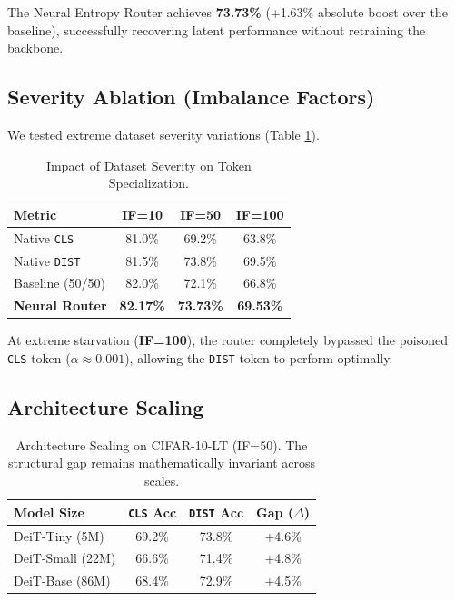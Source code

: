 \documentclass[10pt,twocolumn,letterpaper]{article}
\begin{document}
The Neural Entropy Router achieves \textbf{73.73\%} (+1.63\% absolute boost over the baseline), successfully recovering latent performance without retraining the backbone. 

\subsection{Severity Ablation (Imbalance Factors)}

We tested extreme dataset severity variations (Table \ref{tab:severity}). 

\begin{table}[h]
\centering
\begin{tabular}{lccc}
\toprule
\textbf{Metric} & \textbf{IF=10} & \textbf{IF=50} & \textbf{IF=100} \\
\midrule
Native \texttt{CLS} & 81.0\% & 69.2\% & 63.8\% \\
Native \texttt{DIST} & 81.5\% & 73.8\% & 69.5\% \\
\midrule
Baseline (50/50) & 82.0\% & 72.1\% & 66.8\% \\
\textbf{Neural Router} & \textbf{82.17\%} & \textbf{73.73\%} & \textbf{69.53\%} \\
\bottomrule
\end{tabular}
\caption{Impact of Dataset Severity on Token Specialization.}
\label{tab:severity}
\end{table}

At extreme starvation (\textbf{IF=100}), the router completely bypassed the poisoned \texttt{CLS} token ($\alpha \approx 0.001$), allowing the \texttt{DIST} token to perform optimally.

\subsection{Architecture Scaling}

\begin{table}[h]
\centering
\begin{tabular}{lccc}
\toprule
\textbf{Model Size} & \textbf{\texttt{CLS} Acc} & \textbf{\texttt{DIST} Acc} & \textbf{Gap ($\Delta$)} \\
\midrule
DeiT-Tiny (5M) & 69.2\% & 73.8\% & +4.6\% \\
DeiT-Small (22M) & 66.6\% & 71.4\% & +4.8\% \\
DeiT-Base (86M) & 68.4\% & 72.9\% & +4.5\% \\
\bottomrule
\end{tabular}
\caption{Architecture Scaling on CIFAR-10-LT (IF=50). The structural gap remains mathematically invariant across scales.}
\label{tab:scaling}
\end{table}
\end{document}
